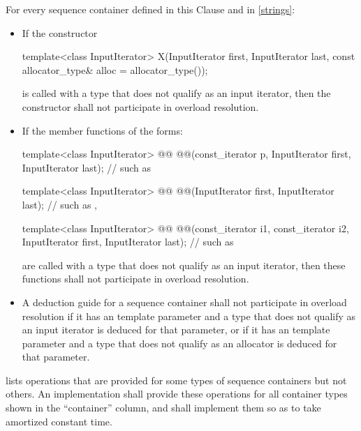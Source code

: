 \documentclass{wg21}
\begin{document}
\pnum
For every sequence container defined in this Clause and in \ref{strings}:
\begin{itemize}
    \item If the constructor
    \begin{codeblock}
        template<class InputIterator>
        X(InputIterator first, InputIterator last,
        const allocator_type& alloc = allocator_type());
    \end{codeblock}
    is called with a type  that does not qualify as an input
    iterator, then the constructor
    shall not participate in overload resolution.

    \item If the member functions of the forms:
    \begin{codeblock}
        template<class InputIterator>
        @@ @@(const_iterator p,
        InputIterator first, InputIterator last);       // such as 

        template<class InputIterator>
        @@ @@(InputIterator first, InputIterator last);       // such as , 

        template<class InputIterator>
        @@ @@(const_iterator i1, const_iterator i2,
        InputIterator first, InputIterator last);       // such as 
    \end{codeblock}
    are called with a type  that does not qualify as an input
    iterator, then these functions
    shall not participate in overload resolution.

    \item A deduction guide for a sequence container shall not participate in overload resolution
    if it has an  template parameter and a type that does not
    qualify as an input iterator is deduced for that parameter,
    or if it has an  template parameter and a type that does not
    qualify as an allocator is deduced for that parameter.
\end{itemize}

\pnum
{} lists operations
that are provided for some types of
sequence containers but not others.
An implementation shall provide
these operations for all container types shown in the ``container''
column, and shall implement them so as to take amortized constant
time.
\end{document}
